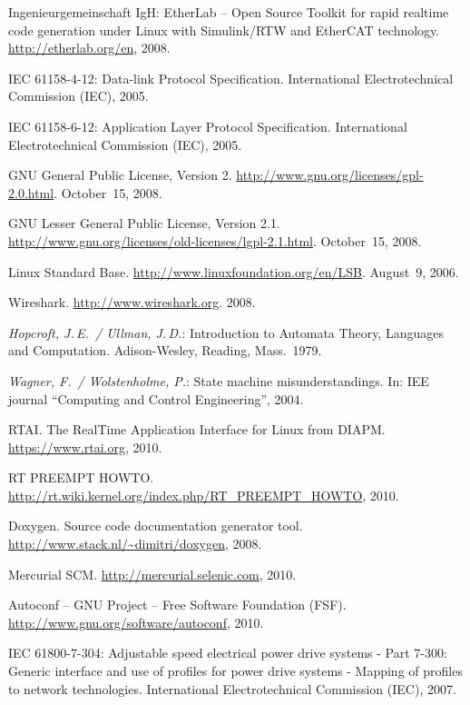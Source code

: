 \documentclass[a4paper,12pt,BCOR6mm,bibtotoc,idxtotoc]{scrbook}
\renewcommand\nomname{Glossary}
\begin{document}
\begin{thebibliography}{99}

 Ingenieurgemeinschaft IgH: EtherLab -- Open Source Toolkit
for rapid realtime code generation under Linux with Simulink/RTW and EtherCAT
technology. \url{http://etherlab.org/en}, 2008.

 IEC 61158-4-12: Data-link Protocol Specification.
International Electrotechnical Commission (IEC), 2005.

 IEC 61158-6-12: Application Layer Protocol Specification.
International Electrotechnical Commission (IEC), 2005.

 GNU General Public License, Version 2.
\url{http://www.gnu.org/licenses/gpl-2.0.html}. October~15, 2008.

 GNU Lesser General Public License, Version 2.1.
\url{http://www.gnu.org/licenses/old-licenses/lgpl-2.1.html}. October~15,
2008.

 Linux Standard Base.
\url{http://www.linuxfoundation.org/en/LSB}. August~9, 2006.

 Wireshark. \url{http://www.wireshark.org}. 2008.

 {\it Hopcroft, J.\,E.\ / Ullman, J.\,D.}: Introduction to
Automata Theory, Languages and Computation. Adison-Wesley, Reading,
Mass.~1979.

 {\it Wagner, F.\ / Wolstenholme, P.}: State machine
misunderstandings. In: IEE journal ``Computing and Control Engineering'',
2004.

 RTAI. The RealTime Application Interface for Linux from DIAPM.
\url{https://www.rtai.org}, 2010.

 RT PREEMPT HOWTO.
\url{http://rt.wiki.kernel.org/index.php/RT_PREEMPT_HOWTO}, 2010.

 Doxygen. Source code documentation generator tool.
\url{http://www.stack.nl/~dimitri/doxygen}, 2008.

 Mercurial SCM. \url{http://mercurial.selenic.com}, 2010.

 Autoconf -- GNU Project -- Free Software Foundation (FSF).
\url{http://www.gnu.org/software/autoconf}, 2010.

 IEC 61800-7-304: Adjustable speed electrical power drive
systems - Part 7-300: Generic interface and use of profiles for power drive
systems - Mapping of profiles to network technologies. International
Electrotechnical Commission (IEC), 2007.

\end{thebibliography}

\printnomenclature
\addcontentsline{toc}{chapter}{\nomname}
\markleft{\nomname}

\printindex
{}

\end{document}
